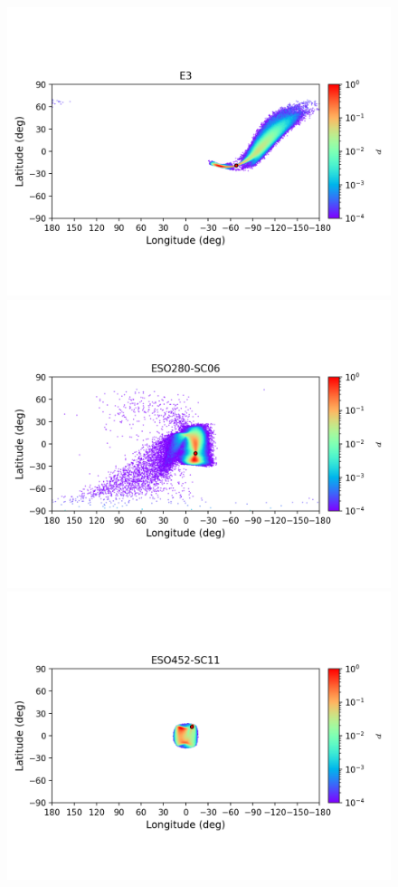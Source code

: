 \begin{figure}
\begin{center}
                \includegraphics[clip=true, trim = 0mm 20mm 0mm 10mm, width=1\columnwidth]{images/error_plots_E3.png}
                \includegraphics[clip=true, trim = 0mm 20mm 0mm 10mm, width=1\columnwidth]{images/error_plots_ESO280-SC06.png}
                \includegraphics[clip=true, trim = 0mm 20mm 0mm 10mm, width=1\columnwidth]{images/error_plots_ESO452-SC11.png}

\end{center}
\end{figure}
